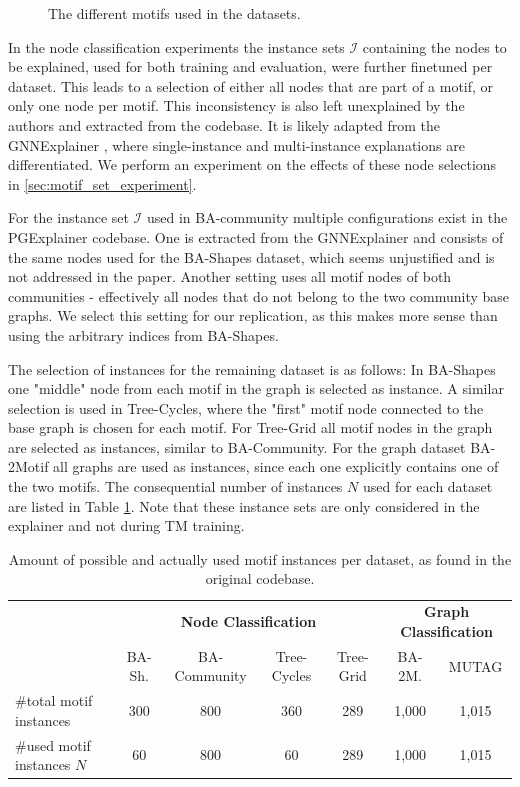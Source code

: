 \begin{figure}[h]
    \caption[The different motifs used in the datasets]{The different motifs used in the datasets.}
    \label{fig:motifs}
\end{figure}

In the node classification experiments the instance sets $\mathcal{I}$ containing the nodes to be explained, used for both training and evaluation, were further finetuned per dataset. This leads to a selection of either all nodes that are part of a motif, or only one node per motif. This inconsistency is also left unexplained by the authors and extracted from the codebase. It is likely adapted from the GNNExplainer \cite{ying2019gnnexplainer}, where single-instance and multi-instance explanations are differentiated. We perform an experiment on the effects of these node selections in \ref{sec:motif_set_experiment}.

For the instance set $\mathcal{I}$ used in BA-community multiple configurations exist in the PGExplainer codebase. One is extracted from the GNNExplainer \cite{ying2019gnnexplainer} and consists of the same nodes used for the BA-Shapes dataset, which seems unjustified and is not addressed in the paper. Another setting uses all motif nodes of both communities - effectively all nodes that do not belong to the two community base graphs. We select this setting for our replication, as this makes more sense than using the arbitrary indices from BA-Shapes. \bigskip

The selection of instances for the remaining dataset is as follows: In BA-Shapes one "middle" node from each motif in the graph is selected as instance. A similar selection is used in Tree-Cycles, where the "first" motif node connected to the base graph is chosen for each motif. For Tree-Grid all motif nodes in the graph are selected as instances, similar to BA-Community. For the graph dataset BA-2Motif all graphs are used as instances, since each one explicitly contains one of the two motifs. The consequential number of instances $N$ used for each dataset are listed in Table \ref{tab:motif-statistics}. Note that these instance sets are only considered in the explainer and not during \ac{TM} training.

\begin{table}[h]
    \centering
    \scriptsize
    \begin{tabular}{l|cccc|cc}
    \multicolumn{1}{c}{\textbf{}} & \multicolumn{4}{c}{\textbf{Node Classification}} & \multicolumn{2}{c}{\textbf{Graph Classification}} \\
    \addlinespace
    \textbf{} & BA-Sh. & BA-Community & Tree-Cycles & Tree-Grid & BA-2M. & MUTAG \\
    \hline
    \#total motif instances & 300 & 800 & 360 & 289 & 1,000 & 1,015 \\
    \#used motif instances $N$ & 60 & 800 & 60 & 289 & 1,000 & 1,015 \\
    \end{tabular}
    \caption[Statistics of motif instances per dataset]{Amount of possible and actually used motif instances per dataset, as found in the original codebase.}
    \label{tab:motif-statistics}
\end{table}

